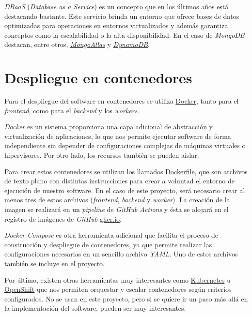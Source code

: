 \textit{DBaaS} (\textit{Database as a Service}) es un concepto que en los últimos años está destacando bastante. Este servicio brinda un entorno que ofrece bases de datos optimizadas para operaciones en entornos virtualizados y además garantiza conceptos como la escalabilidad o la alta disponibilidad. En el caso de \textit{MongoDB} destacan, entre otros, \href{https://www.mongodb.com/atlas/database}{\textit{MongoAtlas}} y \href{https://aws.amazon.com/es/dynamodb/}{\textit{DynamoDB}}.

\section{Despliegue en contenedores}

Para el despliegue del software en contenedores se utiliza \href{https://www.docker.com/}{Docker}, tanto para el \textit{frontend}, como para el \textit{backend} y los \textit{workers}.

\textit{Docker} es un sistema proporciona una capa adicional de abstracción y virtualización de aplicaciones, lo que nos permite ejecutar software de forma independiente sin depender de configuraciones complejas de máquinas virtuales o hipervisores. Por otro lado, los recursos también se pueden aislar.

Para crear estos contenedores se utilizan los llamados \href{https://docs.docker.com/engine/reference/builder/}{Dockerfile}, que son archivos de texto plano con distintas instrucciones para crear a voluntad el entorno de ejecución de nuestro software. En el caso de este proyecto, será necesario crear al menos tres de estos archivos (\textit{frontend}, \textit{backend} y \textit{worker}). La creación de la imagen se realizará en un \textit{pipeline} de \textit{GitHub Actions} y ésta se alojará en el registro de imágenes de \textit{GitHub} \href{https://github.com/features/packages}{ghcr.io}.

\textit{Docker Compose} es otra herramienta adicional que facilita el proceso de construcción y despliegue de contenedores, ya que permite realizar las configuraciones necesarias en un sencillo archivo \textit{YAML}. Uno de estos archivos también se incluye en el proyecto.

Por último, existen otras herramientas muy interesantes como \href{https://kubernetes.io/es/}{Kubernetes} u \href{https://www.redhat.com/es/technologies/cloud-computing/openshift}{OpenShift} que nos permiten orquestar y escalar contenedores según criterios configurados. No se usan en este proyecto, pero si se quiere ir un paso más allá en la implementación del software, pueden ser muy interesantes.
